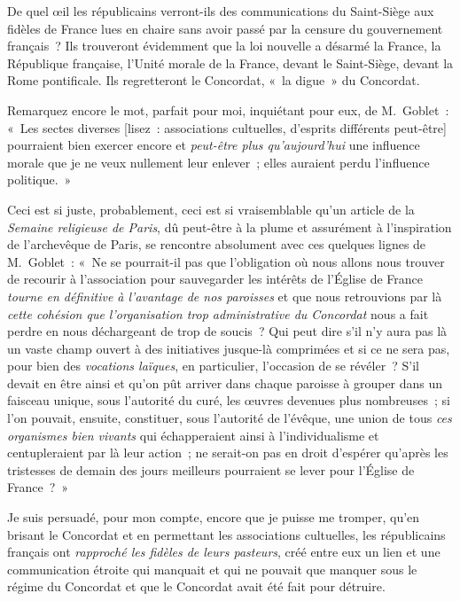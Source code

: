 \documentclass[french,twoside]{book} %
\begin{document}
De quel œil les républicains verront-ils des communications du Saint-Siège aux fidèles de France lues en chaire sans avoir passé par la censure du gouvernement français ? Ils trouveront évidemment que la loi nouvelle a désarmé la France, la République française, l’Unité morale de la France, devant le Saint-Siège, devant la Rome pontificale. Ils regretteront le Concordat, « la digue » du Concordat.\par
Remarquez encore le mot, parfait pour moi, inquiétant pour eux, de M. Goblet : « Les sectes diverses [lisez : associations cultuelles, d’esprits différents peut-être] pourraient bien exercer encore et {\itshape peut-être plus qu’aujourd’hui} une influence morale que je ne veux nullement leur enlever ;  elles auraient perdu l’influence politique. »\par
Ceci est si juste, probablement, ceci est si vraisemblable qu’un article de la \emph{Semaine religieuse de Paris}, dû peut-être à la plume et assurément à l’inspiration de l’archevêque de Paris, se rencontre absolument avec ces quelques lignes de M. Goblet : « Ne se pourrait-il pas que l’obligation où nous allons nous trouver de recourir à l’association pour sauvegarder les intérêts de l’Église de France {\itshape tourne en définitive à l’avantage de nos paroisses} et que nous retrouvions par là {\itshape cette cohésion que l’organisation trop administrative du Concordat} nous a fait perdre en nous déchargeant de trop de soucis ? Qui peut dire s’il n’y aura pas là un vaste champ ouvert à des initiatives jusque-là comprimées et si ce ne sera pas, pour bien des {\itshape vocations laïques}, en particulier, l’occasion de se révéler ? S’il devait en être ainsi et qu’on pût arriver dans chaque paroisse à grouper dans un faisceau unique, sous l’autorité du curé, les œuvres devenues plus nombreuses ; si l’on pouvait, ensuite, constituer, sous l’autorité de l’évêque, une union de tous {\itshape ces organismes bien vivants} qui échapperaient ainsi à l’individualisme et centupleraient par là leur action ; ne serait-on pas en droit d’espérer qu’après les tristesses de demain des jours meilleurs pourraient se lever pour l’Église de France ? »\par
 Je suis persuadé, pour mon compte, encore que je puisse me tromper, qu’en brisant le Concordat et en permettant les associations cultuelles, les républicains français ont {\itshape rapproché les fidèles de leurs pasteurs}, créé entre eux un lien et une communication étroite qui manquait et qui ne pouvait que manquer sous le régime du Concordat et que le Concordat avait été fait pour détruire.\par
\end{document}
